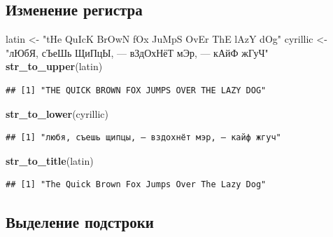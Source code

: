 \documentclass[
]{book}
\newenvironment{Shaded}{\begin{snugshade}}{\end{snugshade}}
\newcommand{\KeywordTok}[1]{\textcolor[rgb]{0.13,0.29,0.53}{\textbf{#1}}}
\newcommand{\NormalTok}[1]{#1}
\newcommand{\StringTok}[1]{\textcolor[rgb]{0.31,0.60,0.02}{#1}}
\begin{document}
\hypertarget{ux438ux437ux43cux435ux43dux435ux43dux438ux435-ux440ux435ux433ux438ux441ux442ux440ux430}{%
\subsection{Изменение регистра}\label{ux438ux437ux43cux435ux43dux435ux43dux438ux435-ux440ux435ux433ux438ux441ux442ux440ux430}}

\begin{Shaded}
\begin{Highlighting}[]
\NormalTok{latin <-}\StringTok{ "tHe QuIcK BrOwN fOx JuMpS OvEr ThE lAzY dOg"}
\NormalTok{cyrillic <-}\StringTok{ "лЮбЯ, сЪеШь ЩиПцЫ, — вЗдОхНёТ мЭр, — кАйФ жГуЧ"}
\KeywordTok{str_to_upper}\NormalTok{(latin)}
\end{Highlighting}
\end{Shaded}

\begin{verbatim}
## [1] "THE QUICK BROWN FOX JUMPS OVER THE LAZY DOG"
\end{verbatim}

\begin{Shaded}
\begin{Highlighting}[]
\KeywordTok{str_to_lower}\NormalTok{(cyrillic)}
\end{Highlighting}
\end{Shaded}

\begin{verbatim}
## [1] "любя, съешь щипцы, — вздохнёт мэр, — кайф жгуч"
\end{verbatim}

\begin{Shaded}
\begin{Highlighting}[]
\KeywordTok{str_to_title}\NormalTok{(latin)}
\end{Highlighting}
\end{Shaded}

\begin{verbatim}
## [1] "The Quick Brown Fox Jumps Over The Lazy Dog"
\end{verbatim}

\hypertarget{ux432ux44bux434ux435ux43bux435ux43dux438ux435-ux43fux43eux434ux441ux442ux440ux43eux43aux438}{%
\subsection{Выделение подстроки}\label{ux432ux44bux434ux435ux43bux435ux43dux438ux435-ux43fux43eux434ux441ux442ux440ux43eux43aux438}}
\end{document}
